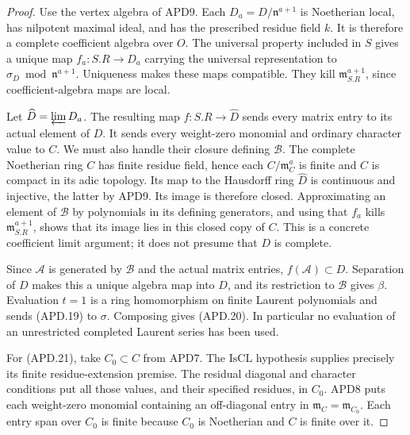 \begin{proof}
Use the vertex algebra of APD9.  Each
\(D_a=D/\mathfrak n^{a+1}\) is Noetherian local, has nilpotent
maximal ideal, and has the prescribed residue field \(k\).
It is therefore a complete coefficient algebra over \(O\).
The universal property included in \(S\) gives a unique map
\(f_a:S.R\to D_a\) carrying the universal representation to
\(\sigma_D\bmod\mathfrak n^{a+1}\).  Uniqueness makes these
maps compatible.  They kill \(\mathfrak m_{S.R}^{a+1}\), since
coefficient-algebra maps are local.

Let \(\widehat D=\varprojlim D_a\).  The resulting map
\(f:S.R\to\widehat D\) sends every matrix entry to its actual
element of \(D\).  It sends every weight-zero monomial and
ordinary character value to \(C\).  We must also handle their
closure defining \(\mathcal B\).  The complete Noetherian ring
\(C\) has finite residue field, hence each
\(C/\mathfrak m_C^a\) is finite and \(C\) is compact in its
adic topology.  Its map to the Hausdorff ring \(\widehat D\)
is continuous and injective, the latter by APD9.  Its image is
therefore closed.  Approximating an element of \(\mathcal B\)
by polynomials in its defining generators, and using that \(f_a\)
kills \(\mathfrak m_{S.R}^{a+1}\), shows that its image lies
in this closed copy of \(C\).  This is a concrete coefficient
limit argument; it does not presume that \(D\) is complete.

Since \(\mathcal A\) is generated by \(\mathcal B\) and
the actual matrix entries, \(f(\mathcal A)\subset D\).
Separation of \(D\) makes this a unique algebra map into
\(D\), and its restriction to \(\mathcal B\) gives \(\beta\).
Evaluation \(t=1\) is a ring homomorphism on finite Laurent
polynomials and sends (APD.19) to \(\sigma\).  Composing
gives (APD.20).  In particular no evaluation of an unrestricted
completed Laurent series has been used.

For (APD.21), take \(C_0\subset C\) from APD7.  The
\(\mathrm{IsCL}\) hypothesis supplies precisely its finite
residue-extension premise.  The residual diagonal and character
conditions put all those values, and their specified residues,
in \(C_0\).  APD8 puts each weight-zero monomial containing an
off-diagonal entry in \(\mathfrak m_C=\mathfrak m_{C_0}\).
Each entry span over \(C_0\) is finite because \(C_0\) is
Noetherian and \(C\) is finite over it.


\end{proof}

